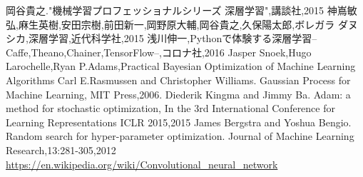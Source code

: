 \begin{thebibliography}{99}
  岡谷貴之."機械学習プロフェッショナルシリーズ 深層学習",講談社,2015
  神嶌敏弘,麻生英樹,安田宗樹,前田新一,岡野原大輔,岡谷貴之,久保陽太郎,ボレガラ ダヌシカ,深層学習,近代科学社,2015
  浅川伸一,Pythonで体験する深層学習--Caffe,Theano,Chainer,TensorFlow--,コロナ社,2016
  Jasper Snoek,Hugo Larochelle,Ryan P.Adams,Practical Bayesian Optimization of Machine Learning Algorithms
  Carl E.Rasmussen and Christopher Williams. Gaussian Process for Machine Learning, MIT Press,2006.
  Diederik Kingma and Jimmy Ba. Adam: a method for stochastic optimization, In the 3rd International Conference for Learning Representations ICLR 2015,2015
   James Bergstra and Yoshua Bengio. Random search for hyper-parameter optimization. Journal of Machine Learning Research,13:281-305,2012
   \url{https://en.wikipedia.org/wiki/Convolutional_neural_network}
\end{thebibliography}




